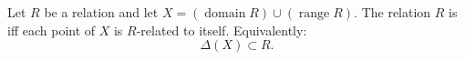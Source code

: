 Let $R$ be a relation and let $X = (\operatorname{domain} R) \cup (\operatorname{range} R)$. The relation $R$ is  iff each point of $X$ is $R$-related to itself. Equivalently:
$$
\Delta(X) \subset R.
$$

